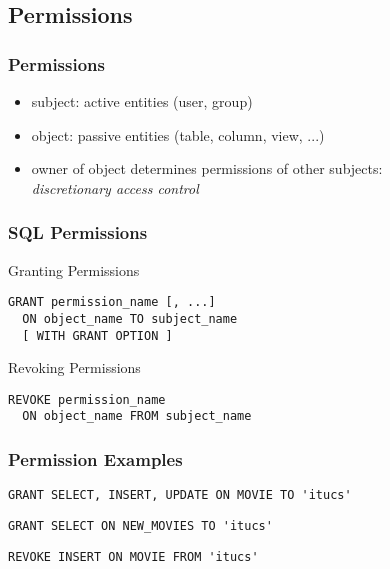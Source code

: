 \documentclass[dvipsnames]{beamer}
\theoremstyle{plain}
\begin{document}
\subsection{Permissions}

\begin{frame}
  \frametitle{Permissions}

  \begin{itemize}
    \item \alert{subject}: active entities (user, group)
    \item \alert{object}: passive entities (table, column, view, ...)

    \pause
    \item owner of object determines permissions of other subjects:\\
      \emph{discretionary access control}
  \end{itemize}
\end{frame}

\begin{frame}[fragile]
  \frametitle{SQL Permissions}

  \begin{block}{Granting Permissions}
    \begin{lstlisting}[language=ExtendedSQL]
GRANT permission_name [, ...]
  ON object_name TO subject_name
  [ WITH GRANT OPTION ]
    \end{lstlisting}
  \end{block}

  \pause
  \begin{block}{Revoking Permissions}
    \begin{lstlisting}[language=ExtendedSQL]
REVOKE permission_name
  ON object_name FROM subject_name
    \end{lstlisting}
  \end{block}
\end{frame}

\begin{frame}[fragile]
  \frametitle{Permission Examples}

  \begin{example}
    \begin{lstlisting}[language=ExtendedSQL]
GRANT SELECT, INSERT, UPDATE ON MOVIE TO 'itucs'
    \end{lstlisting}
  \end{example}

  \pause
  \begin{example}
    \begin{lstlisting}[language=ExtendedSQL]
GRANT SELECT ON NEW_MOVIES TO 'itucs'
    \end{lstlisting}
  \end{example}

  \pause
  \begin{example}
    \begin{lstlisting}[language=ExtendedSQL]
REVOKE INSERT ON MOVIE FROM 'itucs'
    \end{lstlisting}
  \end{example}
\end{frame}
\end{document}
